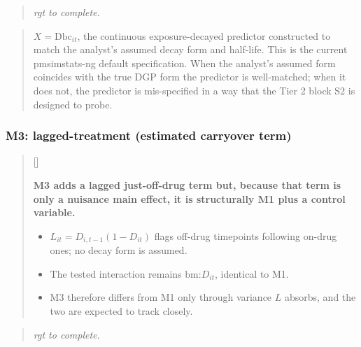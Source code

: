 \documentclass[
  11pt,
]{article}
\newcounter{pgraph}
\newenvironment{bullets}{%
  \stepcounter{pgraph}%
  \begin{quote}\small\sffamily\color[gray]{0.30}%
  {\normalfont\scriptsize\color[gray]{0.58}[\thepgraph]\enspace}}{%
  \end{quote}}
\newenvironment{rgt}{%
  \begin{quote}\small\itshape\color[RGB]{20,60,160}}{%
  \end{quote}}
\newenvironment{orig}{%
  \begin{quote}\normalsize\color[gray]{0.55}}{%
  \end{quote}}
\begin{document}
\begin{rgt}
rgt to complete.

\end{rgt}

\begin{orig}
\(X = \text{Dbc}_{it}\), the continuous exposure-decayed predictor
constructed to match the analyst's assumed decay form and
half-life. This is the current pmsimstats-ng default
specification. When the analyst's assumed form coincides with the
true DGP form the predictor is well-matched; when it does not,
the predictor is mis-specified in a way that the Tier 2 block S2
is designed to probe.

\end{orig}

\subsubsection{M3: lagged-treatment (estimated carryover term)}\label{m3-lagged-treatment-estimated-carryover-term}

\begin{bullets}

\textbf{M3 adds a lagged just-off-drug term but, because that term
is only a nuisance main effect, it is structurally M1 plus a
control variable.}

\begin{itemize}\setlength{\itemsep}{2pt}\setlength{\parskip}{0pt}
\item $L_{it} = D_{i,t-1}(1 - D_{it})$ flags off-drug timepoints
following on-drug ones; no decay form is assumed.
\item The tested interaction remains $\text{bm:}D_{it}$, identical
to M1.
\item M3 therefore differs from M1 only through variance $L$
absorbs, and the two are expected to track closely.
\end{itemize}

\end{bullets}

\begin{rgt}
rgt to complete.

\end{rgt}
\end{document}
